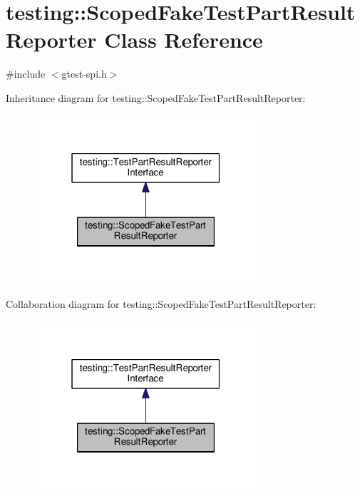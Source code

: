 \hypertarget{classtesting_1_1ScopedFakeTestPartResultReporter}{}\section{testing\+:\+:Scoped\+Fake\+Test\+Part\+Result\+Reporter Class Reference}
\label{classtesting_1_1ScopedFakeTestPartResultReporter}


{\ttfamily \#include $<$gtest-\/spi.\+h$>$}



Inheritance diagram for testing\+:\+:Scoped\+Fake\+Test\+Part\+Result\+Reporter\+:\nopagebreak
\begin{figure}[H]
\begin{center}
\leavevmode
\includegraphics[width=235pt]{classtesting_1_1ScopedFakeTestPartResultReporter__inherit__graph}
\end{center}
\end{figure}


Collaboration diagram for testing\+:\+:Scoped\+Fake\+Test\+Part\+Result\+Reporter\+:\nopagebreak
\begin{figure}[H]
\begin{center}
\leavevmode
\includegraphics[width=235pt]{classtesting_1_1ScopedFakeTestPartResultReporter__coll__graph}
\end{center}
\end{figure}
